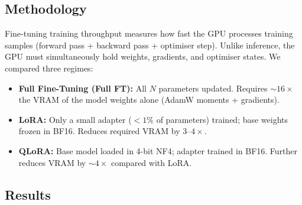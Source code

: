 \documentclass[11pt,a4paper]{article}
\begin{document}
\subsection{Methodology}
Fine-tuning training throughput measures how fast the GPU processes training samples
(forward pass + backward pass + optimiser step). Unlike inference, the GPU must
simultaneously hold weights, gradients, and optimiser states. We compared three regimes:

\begin{itemize}
  \item \textbf{Full Fine-Tuning (Full FT):} All $N$ parameters updated. Requires
        ${\sim}16\times$ the VRAM of the model weights alone (AdamW moments + gradients).
  \item \textbf{LoRA:} Only a small adapter ($<1\%$ of parameters) trained; base
        weights frozen in BF16. Reduces required VRAM by $3$--$4\times$.
  \item \textbf{QLoRA:} Base model loaded in 4-bit NF4; adapter trained in BF16.
        Further reduces VRAM by ${\sim}4\times$ compared with LoRA.
\end{itemize}

\subsection{Results}
\end{document}
